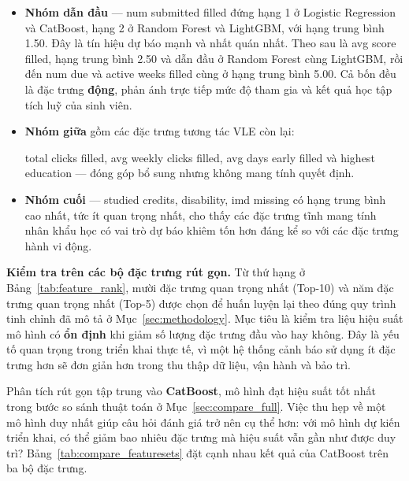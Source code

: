 \documentclass[a4paper]{report}
\newcommand{\code}[1]{{\ttfamily\def\_{\textunderscore\discretionary{}{}{}}#1}}
\def\code#1{#1}%
\def\_{ }%
\begin{document}
\begin{itemize}[leftmargin=*]
  \item \textbf{Nhóm dẫn đầu} --- \code{num\_submitted\_filled} đứng hạng 1 ở
        Logistic Regression và CatBoost, hạng 2 ở Random Forest và LightGBM,
        với hạng trung bình 1.50. Đây là tín hiệu dự báo mạnh và nhất quán
        nhất. Theo sau là \code{avg\_score\_filled}, hạng trung bình 2.50 và
        dẫn đầu ở Random Forest cùng LightGBM, rồi đến \code{num\_due} và
        \code{active\_weeks\_filled} cùng ở hạng trung bình 5.00. Cả bốn đều là
        đặc trưng \textbf{động}, phản ánh trực tiếp mức độ tham gia và kết quả
        học tập tích luỹ của sinh viên.
  \item \textbf{Nhóm giữa} gồm các đặc trưng tương tác VLE còn lại:
        \begingroup\raggedright
        \code{total\_clicks\_filled}, \code{avg\_weekly\_clicks\_filled},
        \code{avg\_days\_early\_filled} và \code{highest\_education} --- đóng
        góp bổ sung nhưng không mang tính quyết định.
        \par\endgroup
  \item \textbf{Nhóm cuối} --- \code{studied\_credits}, \code{disability},
        \code{imd\_missing} có hạng trung bình cao nhất, tức ít quan trọng nhất,
        cho thấy các đặc trưng tĩnh mang tính nhân khẩu học có vai trò dự báo
        khiêm tốn hơn đáng kể so với các đặc trưng hành vi động.
\end{itemize}

\textbf{Kiểm tra trên các bộ đặc trưng rút gọn.} Từ thứ hạng ở
Bảng~\ref{tab:feature_rank}, mười đặc trưng quan trọng nhất (Top-10) và năm đặc
trưng quan trọng nhất (Top-5) được chọn để huấn luyện lại theo đúng quy trình
tinh chỉnh đã mô tả ở Mục~\ref{sec:methodology}. Mục tiêu là kiểm tra liệu hiệu
suất mô hình có \textbf{ổn định} khi giảm số lượng đặc trưng đầu vào hay không.
Đây là yếu tố quan trọng trong triển khai thực tế, vì một hệ thống cảnh báo sử
dụng ít đặc trưng hơn sẽ đơn giản hơn trong thu thập dữ liệu, vận hành và bảo
trì.

Phân tích rút gọn tập trung vào \textbf{CatBoost}, mô hình đạt hiệu suất tốt
nhất trong bước so sánh thuật toán ở Mục~\ref{sec:compare_full}. Việc thu hẹp
về một mô hình duy nhất giúp câu hỏi đánh giá trở nên cụ thể hơn: với mô hình
dự kiến triển khai, có thể giảm bao nhiêu đặc trưng mà hiệu suất vẫn gần như
được duy trì? Bảng~\ref{tab:compare_featuresets} đặt cạnh nhau kết quả của
CatBoost trên ba bộ đặc trưng.


\end{document}
